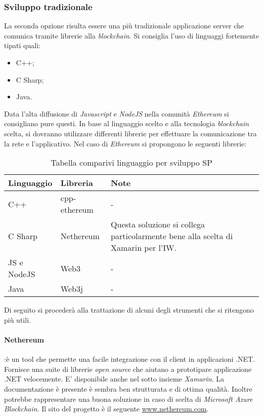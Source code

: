 \subsubsection{Sviluppo tradizionale}
La seconda opzione risulta essere una più tradizionale applicazione server che comunica tramite librerie alla \emph{blockchain}. Si consiglia l’uso di linguaggi fortemente tipati quali: 
\begin{itemize}
    \item C++;
    \item C Sharp;
    \item Java.
\end{itemize}
Data l’alta diffusione di \emph{Javascript} e \emph{NodeJS} nella comunità \emph{Ethereum} si consigliano pure questi.
In base al linguaggio scelto e alla tecnologia \emph{blockchain} scelta, si dovranno utilizzare differenti librerie per effettuare la comunicazione tra la rete e l’applicativo. Nel caso di \emph{Ethereum} si propongono le seguenti librerie:
\begin{table}[!h] %
    \caption{Tabella comparivi linguaggio per sviluppo SP}
    \label{tab:comp-ling}
    \begin{tabularx}{\textwidth}{|l|l|l|X|}
    \hline
    \textbf{Linguaggio} & \textbf{Libreria} & \textbf{Note}\\
    \hline
    C++   & cpp-ethereum & - \\
    \hline
    C Sharp   & Nethereum & Questa soluzione si collega particolarmente bene alla scelta di Xamarin per l’IW. \\
    \hline
    JS e NodeJS   & Web3 & -\\
    \hline
    Java  & Web3j & -\\
    \hline
    \end{tabularx}
\end{table}%

Di seguito si procederà alla trattazione di alcuni degli strumenti che si ritengono più utili.
\paragraph{Nethereum}:è un tool che permette una facile integrazione con il client in applicazioni .NET. Fornisce una suite di librerie \emph{open source} che aiutano a prototipare applicazione .NET velocemente. E’ disponibile anche nel sotto insieme \emph{Xamarin}.  La documentazione è presente è sembra ben strutturata e di ottima qualità. Inoltre potrebbe rappresentare una buona soluzione in caso di scelta di \emph{Microsoft Azure Blockchain}. Il sito del progetto è il seguente \url{www.nethereum.com}.   
